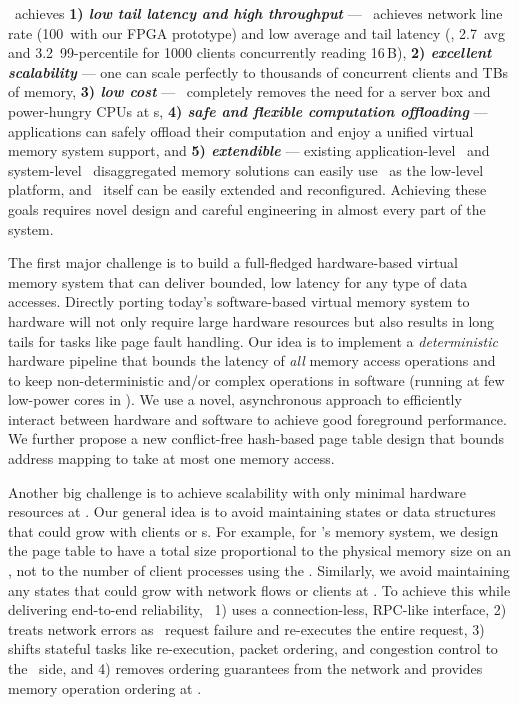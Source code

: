 \sys\ achieves 
\textbf{1) \textit{low tail latency and high throughput}} --- \sys\ achieves network line rate (100\Gbps\ with our FPGA prototype)
and low average and tail latency (\eg, 2.7\mus\ avg and 3.2\mus\ 99-percentile for 1000 clients concurrently reading 16\,B), 
\textbf{2) \textit{excellent scalability}} --- one \MN{} can %
scale perfectly to thousands of concurrent clients and TBs of memory, %
\textbf{3) \textit{low cost}} --- \sys\ completely removes the need for a server box and power-hungry CPUs at \MN{}s,
\textbf{4) \textit{safe and flexible computation offloading}} --- 
applications can safely offload their computation and enjoy a unified virtual memory system support,
and \textbf{5) \textit{extendible}} --- existing application-level~\cite{AIFM} and system-level~\cite{InfiniSwap,FastSwap,Semeru} 
disaggregated memory solutions can easily use \sys\ as the low-level platform,
and \sys\ itself can be easily extended and reconfigured.
Achieving these goals requires novel design and careful engineering in almost every part of the system.

The first major challenge is to build a full-fledged hardware-based virtual memory system that can deliver bounded, low latency for any type of data accesses.
Directly porting today's software-based virtual memory system to hardware will not only require large hardware resources but also results in long tails for tasks like page fault handling.
Our idea is to implement a {\em deterministic} hardware pipeline that bounds the latency of {\em all} memory access operations %
and to keep non-deterministic and/or complex operations in software (running at few low-power cores in \sysboard).
We use a novel, asynchronous approach to efficiently interact between hardware and software to achieve good foreground performance.
We further propose a new conflict-free hash-based page table design that bounds address mapping to take at most one memory access.



Another big challenge is to achieve scalability with only minimal hardware resources at \sysboard.
Our general idea is to avoid maintaining states or data structures that could grow with clients or \CN{}s.
For example, for \sys's memory system, we design the page table to have a total size proportional to the physical memory size on an \MN, 
not to the number of client processes using the \MN.
Similarly, we avoid maintaining any states that could grow with network flows or clients at \sysboard.
To achieve this while delivering end-to-end reliability, 
\sys\ 1) uses a connection-less, RPC-like interface, %
2) treats network errors as \sys\ request failure and re-executes the entire request, 
3) shifts stateful tasks like re-execution, packet ordering, and congestion control to the \CN\ side, %
and 4) removes ordering guarantees from the network and provides memory operation ordering at \syslib.

